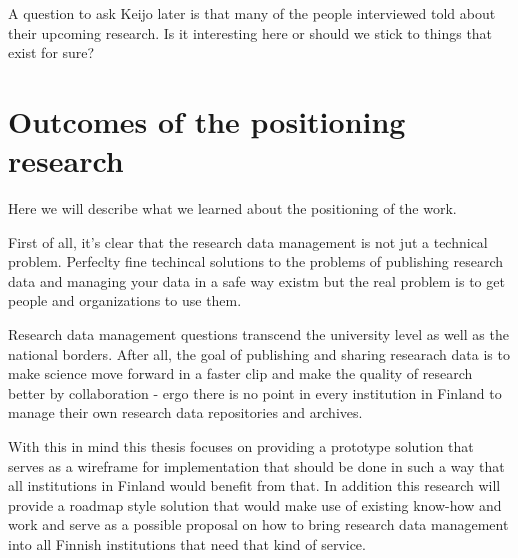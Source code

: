 A question to ask Keijo later is that many of the people interviewed told about
their upcoming research. Is it interesting here or should we stick to things
that exist for sure?

\section{Outcomes of the positioning research}
\label{sec:positioning_outcomes}

Here we will describe what we learned about the positioning of the work.

First of all, it's clear that the research data management is not jut a
technical problem. Perfeclty fine techincal solutions to the problems of
publishing research data and managing your data in a safe way existm but the
real problem is to get people and organizations to use them.

Research data management questions transcend the university level as well
as the national borders. After all, the goal of publishing and sharing
researach data is to make science move forward in a faster clip and make the
quality of research better by collaboration - ergo there is no point in every
institution in Finland to manage their own research data repositories and
archives.

With this in mind this thesis focuses on providing a prototype solution that
serves as a wireframe for implementation that should be done in such a way that
all institutions in Finland would benefit from that. In addition this research
will provide a roadmap style solution that would make use of existing know-how
and work and serve as a possible proposal on how to bring research data
management into all Finnish institutions that need that kind of service.
